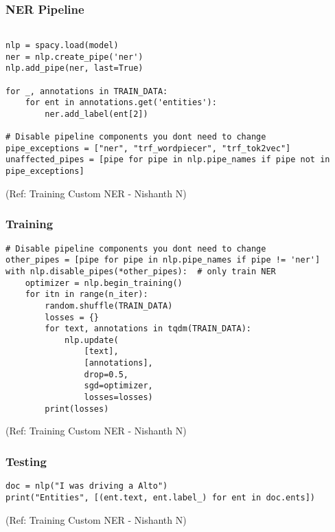 \begin{frame}[fragile]\frametitle{NER Pipeline}


\begin{lstlisting}

nlp = spacy.load(model)  
ner = nlp.create_pipe('ner')
nlp.add_pipe(ner, last=True)

for _, annotations in TRAIN_DATA:
    for ent in annotations.get('entities'):
        ner.add_label(ent[2])
				
# Disable pipeline components you dont need to change
pipe_exceptions = ["ner", "trf_wordpiecer", "trf_tok2vec"]
unaffected_pipes = [pipe for pipe in nlp.pipe_names if pipe not in pipe_exceptions]

\end{lstlisting}

{\tiny (Ref: Training Custom NER - Nishanth N)}

\end{frame}

\begin{frame}[fragile]\frametitle{Training}


\begin{lstlisting}
# Disable pipeline components you dont need to change
other_pipes = [pipe for pipe in nlp.pipe_names if pipe != 'ner']
with nlp.disable_pipes(*other_pipes):  # only train NER
    optimizer = nlp.begin_training()
    for itn in range(n_iter):
        random.shuffle(TRAIN_DATA)
        losses = {}
        for text, annotations in tqdm(TRAIN_DATA):
            nlp.update(
                [text],  
                [annotations],  
                drop=0.5,  
                sgd=optimizer,
                losses=losses)
        print(losses)
\end{lstlisting}

{\tiny (Ref: Training Custom NER - Nishanth N)}

\end{frame}

\begin{frame}[fragile]\frametitle{Testing}


\begin{lstlisting}
doc = nlp("I was driving a Alto")
print("Entities", [(ent.text, ent.label_) for ent in doc.ents])
\end{lstlisting}

{\tiny (Ref: Training Custom NER - Nishanth N)}

\end{frame}
